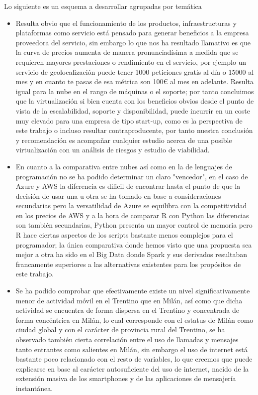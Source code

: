 \documentclass[11pt, a4paper]{article} %
\begin{document}
Lo siguiente es un esquema a desarrollar agrupadas por temática
\begin{itemize}
\item Resulta obvio que el funcionamiento de los productos, infraestructuras y plataformas como servicio está pensado para generar beneficios a la empresa proveedora del servicio, sin embargo lo que nos ha resultado llamativo es que la curva de precios aumenta de manera pronunciadísima a medida que se requieren mayores prestaciones o rendimiento en el servicio, por ejemplo un servicio de geolocalización puede tener 1000 peticiones gratis al día o 15000 al mes y en cuanto te pasas de esa métrica son 100€ al mes en adelante. Resulta igual para la nube en el rango de máquinas o el soporte; por tanto concluimos que la virtualización si bien cuenta con los beneficios obvios desde el punto de vista de la escalabilidad, soporte y disponibilidad, puede incurrir en un coste muy elevado para una empresa de tipo start-up, como es la perspectiva de este trabajo o incluso resultar contraproducente, por tanto nuestra conclusión y recomendación es acompañar cualquier estudio acerca de una posible virtualización con un análisis de riesgos y estudio de viabilidad.
\item En cuanto a la comparativa entre nubes así como en la de lenguajes de programación no se ha podido determinar un claro "vencedor", en el caso de Azure y AWS la diferencia es dificil de encontrar hasta el punto de que la decisión de usar una u otra se ha tomado en base a consideraciones secundarias pero la versatilidad de Azure se equilibra con la competitividad en los precios de AWS y a la hora de comparar R con Python las diferencias son también secundarias, Python presenta un mayor control de memoria pero R hace ciertas aspectos de los scripts bastante menos complejos para el programador; la única comparativa donde hemos visto que una propuesta sea mejor a otra ha sido en el Big Data donde Spark y sus derivados resultaban francamente superiores a las alternativas existentes para los propósitos de este trabajo. 
\item Se ha podido comprobar que efectivamente existe un nivel significativamente menor de actividad móvil en el Trentino que en Milán, así como que dicha actividad se encuentra de forma dispersa en el Trentino y concentrada de forma concéntrica en Milán, lo cual corresponde con el estatus de Milán como ciudad global y con el carácter de provincia rural del Trentino, se ha observado también cierta correlación entre el uso de llamadas y mensajes tanto entrantes como salientes en Milán, sin embargo el uso de internet está bastante poco relacionado con el resto de variables, lo que creemos que puede explicarse en base al carácter autosuficiente del uso de internet, nacido de la extensión masiva de los smartphones y de las aplicaciones de mensajería instantánea. 

\end{itemize}
\end{document}
